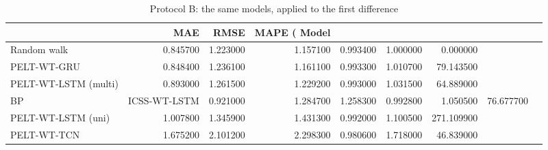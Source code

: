 \begin{table}[htbp]
\caption{Protocol B: the same models, applied to the first difference}
\label{tab:B_stationary}
\begin{tabular}{lrrrrrr}
\toprule
 & MAE & RMSE & MAPE (%
Model &  &  &  &  &  &  \\
\midrule
Random walk & 0.845700 & 1.223000 & 1.157100 & 0.993400 & 1.000000 & 0.000000 \\
PELT-WT-GRU & 0.848400 & 1.236100 & 1.161100 & 0.993300 & 1.010700 & 79.143500 \\
PELT-WT-LSTM (multi) & 0.893000 & 1.261500 & 1.229200 & 0.993000 & 1.031500 & 64.889000 \\
BP&ICSS-WT-LSTM & 0.921000 & 1.284700 & 1.258300 & 0.992800 & 1.050500 & 76.677700 \\
PELT-WT-LSTM (uni) & 1.007800 & 1.345900 & 1.431300 & 0.992000 & 1.100500 & 271.109900 \\
PELT-WT-TCN & 1.675200 & 2.101200 & 2.298300 & 0.980600 & 1.718000 & 46.839000 \\
\bottomrule
\end{tabular}
\end{table}
